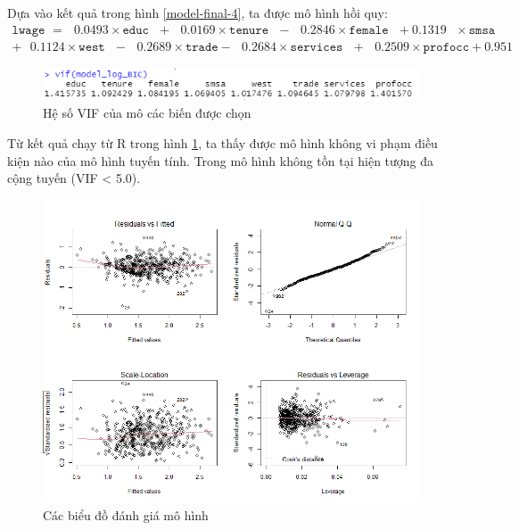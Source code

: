 Dựa vào kết quả trong hình \ref{model-final-4}, ta được mô hình hồi quy:
\begin{equation*}
\begin{multlined}
	\texttt{lwage } = \text{ } 0.0493\times \texttt{educ} \text{ } + \text{ } 0.0169 \times \texttt{tenure} \text{ }-\text{ }0.2846 \times \texttt{female} \text{ } + 0.1319 \text{ } \times \texttt{smsa} \text{ } \\
	+\text{ }0.1124 \times\texttt{west}\text{ } -\text{ }0.2689\times \texttt{trade} -\text{ }0.2684 \times \texttt{services} \text{ } + \text{ }0.2509\times \texttt{profocc} + 0.951
\end{multlined}
\end{equation*}

\begin{figure}[H]
	\centering
	\includegraphics[width=\textwidth]{../Photo Of Result/vif-4}	
	\caption{Hệ số VIF của mô các biến được chọn}
	\label{vif}
\end{figure}

Từ kết quả chạy từ R trong hình \ref{vif}, ta thấy được mô hình không vi phạm điều kiện nào của mô hình tuyến tính. Trong mô hình không tồn tại hiện tượng đa cộng tuyến (VIF < 5.0).

\begin{figure}[H]
	\includegraphics[width=\textwidth]{../Photo Of Result/diagnostic-plot-4}
	\caption{Các biểu đồ đánh giá mô hình}
	\label{diagnostic}
\end{figure}

